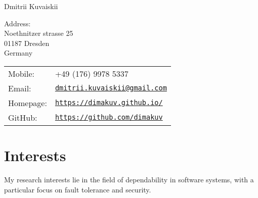 \documentclass[letterpaper]{article}
\def\name{Dmitrii Kuvaiskii}
\begin{document}
{\huge \name}


\vspace{0.25in}

\begin{minipage}{0.45\linewidth}
Address:\\
Noethnitzer strasse 25\\
01187 Dresden\\
Germany\\

 
\end{minipage}
\begin{minipage}{0.45\linewidth}
  \begin{tabular}{ll}
      Mobile: & +49 (176) 9978 5337\\
      Email: & \href{mailto:dmitrii.kuvaiskii@gmail.com}{\tt dmitrii.kuvaiskii@gmail.com} \\
    Homepage: & \href{https://dimakuv.github.io/}{\tt https://dimakuv.github.io/} \\
    GitHub: & \href{https://github.com/dimakuv}{\tt https://github.com/dimakuv} \\
  \end{tabular}
\end{minipage}


\section*{Interests}

My research interests lie in the field of dependability in software systems, with a particular focus on fault tolerance and security. %

\end{document}
